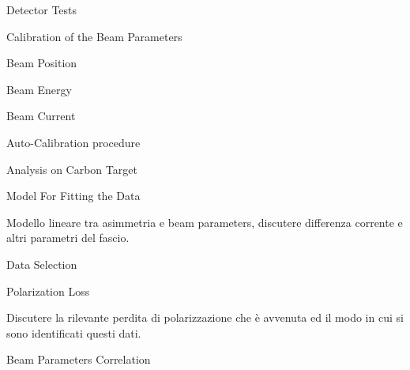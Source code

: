 \documentclass[9pt,a4paper]{beamer}
\begin{document}
\begin{frame}{Detector Tests}

\end{frame}

\begin{frame}{Calibration of the Beam Parameters}

\end{frame}

\begin{frame}{Beam Position}

\end{frame}

\begin{frame}{Beam Energy}

\end{frame}

\begin{frame}{Beam Current}

\end{frame}

\begin{frame}{Auto-Calibration procedure}

\end{frame}

\begin{frame}{Analysis on Carbon Target}

\end{frame}

\begin{frame}{Model For Fitting the Data}

Modello lineare tra asimmetria e beam parameters, discutere differenza corrente e altri parametri del fascio. 

\end{frame}

\begin{frame}{Data Selection}



\end{frame}

\begin{frame}{Polarization Loss}

Discutere la rilevante perdita di polarizzazione che è avvenuta ed il modo in cui si sono identificati questi dati.

\end{frame}

\begin{frame}{Beam Parameters Correlation}

\end{frame}
\end{document}
